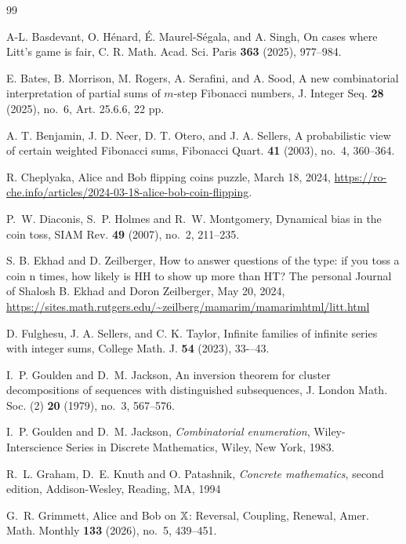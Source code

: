 \documentclass[10pt]{amsart}
\theoremstyle{definition}
\theoremstyle{remark}
\begin{document}
\begin{thebibliography}{99}


A-L. Basdevant, O. H\'enard, \'E. Maurel-S\'egala, and A. Singh, On cases where Litt’s game is fair, C. R. Math. Acad. Sci. Paris {\bf 363} (2025), 977--984.

E. Bates, B. Morrison, M. Rogers, A. Serafini, and A. Sood, A new combinatorial interpretation of partial sums of $m$-step Fibonacci numbers, J. Integer Seq. {\bf 28} (2025), no.~6, Art. 25.6.6, 22 pp.

A. T. Benjamin, J. D. Neer, D. T. Otero, and J. A. Sellers, A probabilistic view of certain weighted Fibonacci sums, Fibonacci Quart. {\bf 41} (2003), no.~4, 360--364.

R. Cheplyaka, Alice and Bob flipping coins puzzle, March 18, 2024,
\url{https://ro-che.info/articles/2024-03-18-alice-bob-coin-flipping}.

P.~W. Diaconis, S.~P. Holmes and R.~W. Montgomery, Dynamical bias in the coin toss, SIAM Rev. {\bf 49} (2007), no.~2, 211--235.
 
S. B. Ekhad and D. Zeilberger, How to answer questions
of the type: if you toss a coin n times, how likely is HH to show up
more than HT? 
The personal Journal of Shalosh B. Ekhad and Doron Zeilberger, May 20, 2024,
\url{https://sites.math.rutgers.edu/~zeilberg/mamarim/mamarimhtml/litt.html}

D. Fulghesu, J. A. Sellers, and C. K. Taylor, Infinite families of infinite series with integer sums, College Math. J. {\bf 54} (2023), 33-–43.


I.~P. Goulden and D.~M. Jackson, An inversion theorem for cluster decompositions of sequences with distinguished subsequences, J. London Math. Soc. (2) {\bf 20} (1979), no.~3, 567--576.

I.~P. Goulden and D.~M. Jackson, {\it Combinatorial enumeration}, Wiley-Interscience Series in Discrete Mathematics, Wiley, New York, 1983.

R.~L. Graham, D.~E. Knuth and O. Patashnik, {\it Concrete mathematics}, second edition, 
Addison-Wesley, Reading, MA, 1994

G.~R. Grimmett, Alice and Bob on $\Bbb{X}$: Reversal, Coupling, Renewal, Amer. Math. Monthly {\bf 133} (2026), no.~5, 439--451.


\end{thebibliography}
\end{document}
